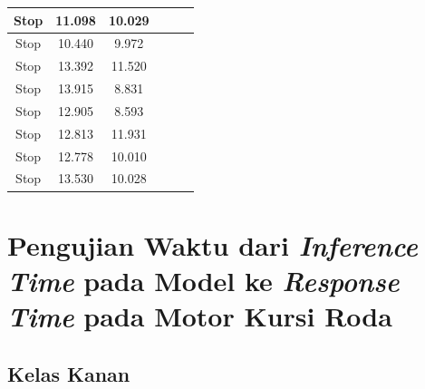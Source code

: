 \begin{longtable}{|c|c|c|c|c|c|}
  Stop           & 11.098              & 10.029           \\ \hline
  Stop           & 10.440              & 9.972            \\ \hline
  Stop           & 13.392              & 11.520           \\ \hline
  Stop           & 13.915              & 8.831            \\ \hline
  Stop           & 12.905              & 8.593            \\ \hline
  Stop           & 12.813              & 11.931           \\ \hline
  Stop           & 12.778              & 10.010           \\ \hline
  Stop           & 13.530              & 10.028           \\ \hline
\end{longtable}

\section{Pengujian Waktu dari \emph{Inference Time} pada Model ke \emph{Response Time} pada Motor Kursi Roda}

\subsection{Kelas Kanan}

